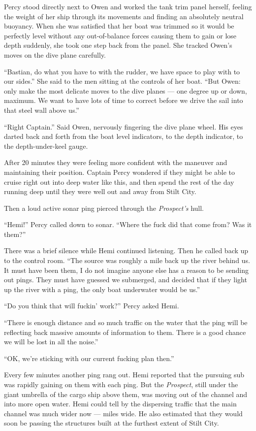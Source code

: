 \documentclass[
]{scrbook}
\begin{document}
Percy stood directly next to Owen and worked the tank trim panel
herself, feeling the weight of her ship through its movements and
finding an absolutely neutral buoyancy. When she was satisfied that her
boat was trimmed so it would be perfectly level without any
out-of-balance forces causing them to gain or lose depth suddenly, she
took one step back from the panel. She tracked Owen's moves on the dive
plane carefully.

``Bastian, do what you have to with the rudder, we have space to play
with to our sides.'' She said to the men sitting at the controls of her
boat. ``But Owen: only make the most delicate moves to the dive planes
--- one degree up or down, maximum. We want to have lots of time to
correct before we drive the sail into that steel wall above us.''

``Right Captain.'' Said Owen, nervously fingering the dive plane wheel.
His eyes darted back and forth from the boat level indicators, to the
depth indicator, to the depth-under-keel gauge.

After 20 minutes they were feeling more confident with the maneuver and
maintaining their position. Captain Percy wondered if they might be able
to cruise right out into deep water like this, and then spend the rest
of the day running deep until they were well out and away from Stilt
City.

Then a loud active sonar ping pierced through the \emph{Prospect's}
hull.

``Hemi!'' Percy called down to sonar. ``Where the fuck did that come
from? Was it them?''

There was a brief silence while Hemi continued listening. Then he called
back up to the control room. ``The source was roughly a mile back up the
river behind us. It must have been them, I do not imagine anyone else
has a reason to be sending out pings. They must have guessed we
submerged, and decided that if they light up the river with a ping, the
only boat underwater would be us.''

``Do you think that will fuckin' work?'' Percy asked Hemi.

``There is enough distance and so much traffic on the water that the
ping will be reflecting back massive amounts of information to them.
There is a good chance we will be lost in all the noise.''

``OK, we're sticking with our current fucking plan then.''

Every few minutes another ping rang out. Hemi reported that the pursuing
sub was rapidly gaining on them with each ping. But the \emph{Prospect},
still under the giant umbrella of the cargo ship above them, was moving
out of the channel and into more open water. Hemi could tell by the
dispersing traffic that the main channel was much wider now --- miles
wide. He also estimated that they would soon be passing the structures
built at the furthest extent of Stilt City.
\end{document}
